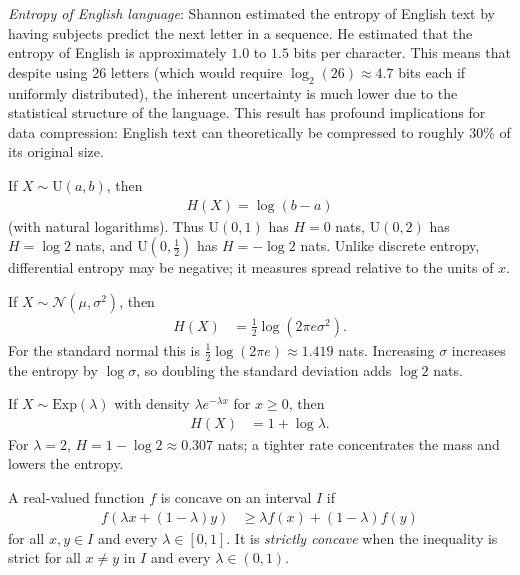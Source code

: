 \documentclass[a4paper, 12pt]{book}
\begin{document}
\begin{example}
    \emph{Entropy of English language}: Shannon estimated the entropy of English text by having subjects predict the next letter in a sequence. He estimated that the entropy of English is approximately $1.0$ to $1.5$ bits per character. This means that despite using 26 letters (which would require $\log_2(26) \approx 4.7$ bits each if uniformly distributed), the inherent uncertainty is much lower due to the statistical structure of the language. This result has profound implications for data compression: English text can theoretically be compressed to roughly $30\%$ of its original size.
\end{example}

\begin{example}
    If $X\sim\mathrm{U}(a,b)$, then 
    \begin{align}
        H(X)=\log(b-a)
    \end{align}
    (with natural logarithms). Thus $\mathrm{U}(0,1)$ has $H=0$ nats, $\mathrm{U}(0,2)$ has $H=\log 2$ nats, and $\mathrm{U}(0,\tfrac12)$ has $H=-\log 2$ nats. Unlike discrete entropy, differential entropy may be negative; it measures spread relative to the units of $x$.
\end{example}

\begin{example}
    If $X\sim\mathscr{N}(\mu,\sigma^2)$, then
    \begin{align}
        H(X) &= \tfrac12\log\left(2\pi e\sigma^2\right).
    \end{align}
    For the standard normal this is $\tfrac12\log(2\pi e)\approx1.419$ nats. Increasing $\sigma$ increases the entropy by $\log\sigma$, so doubling the standard deviation adds $\log 2$ nats.
\end{example}

\begin{example}
    If $X\sim\mathrm{Exp}(\lambda)$ with density $\lambda e^{-\lambda x}$ for $x\ge0$, then
    \begin{align}
        H(X) &= 1+\log\lambda.
    \end{align}
    For $\lambda=2$, $H=1-\log 2\approx0.307$ nats; a tighter rate concentrates the mass and lowers the entropy.
\end{example}

\begin{definition}
    A real-valued function $f$ is concave on an interval $I$ if
    \begin{align}
        f(\lambda x + (1-\lambda)y) &\geq \lambda f(x) + (1-\lambda) f(y)
    \end{align}
    for all $x, y \in I$ and every $\lambda \in [0,1]$. It is \emph{strictly concave}
    when the inequality is strict for all $x \neq y$ in $I$ and every $\lambda \in (0,1)$.
\end{definition}
\end{document}
